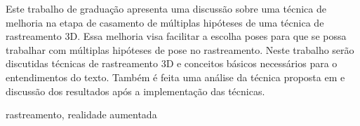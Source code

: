 \resumo
Este trabalho de graduação apresenta uma discussão sobre uma técnica de melhoria na etapa de casamento de múltiplas hipóteses de uma técnica de rastreamento 3D. Essa melhoria visa facilitar a escolha poses para que se possa trabalhar com múltiplas hipóteses de pose no rastreamento. Neste trabalho serão discutidas técnicas de rastreamento 3D e conceitos básicos necessários para o entendimentos do texto. Também é feita uma análise da técnica proposta em \cite{celine} e discussão dos resultados após a implementação das técnicas.
\begin{keywords}
rastreamento, realidade aumentada
\end{keywords}

